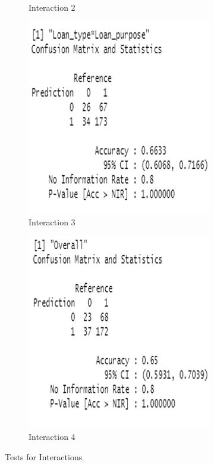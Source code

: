 \documentclass{jpp}
\begin{document}
\begin{figure}
\begin{subfigure}{.475\textwidth}
  \caption{Interaction 2}
\end{subfigure}
\begin{subfigure}{.475\textwidth}
  \centering
  \includegraphics[width=.9\linewidth]{interaction3.png}  
  \caption{Interaction 3}
\end{subfigure}
\begin{subfigure}{.475\textwidth}
  \centering
  \includegraphics[width=.9\linewidth]{interaction4.png}  
  \caption{Interaction 4}
\end{subfigure}
\caption{Tests for Interactions}
\label{interaction}
\end{figure}
\end{document}
